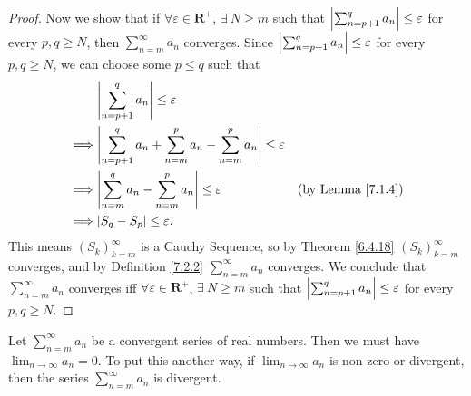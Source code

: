 \begin{proof}
    Now we show that if \(\forall \varepsilon \in \mathbf{R}^+\), \(\exists\ N \geq m\) such that \(\abs*{\sum_{n = p + 1}^q a_n} \leq \varepsilon\) for every \(p, q \geq N\), then \(\sum_{n = m}^\infty a_n\) converges.
    Since \(\abs*{\sum_{n = p + 1}^q a_n} \leq \varepsilon\) for every \(p, q \geq N\), we can choose some \(p \leq q\) such that
    \begin{align*}
                 & \abs*{\sum_{n = p + 1}^q a_n} \leq \varepsilon                                                                           \\
        \implies & \abs*{\sum_{n = p + 1}^q a_n + \sum_{n = m}^p a_n - \sum_{n = m}^p a_n} \leq \varepsilon                                 \\
        \implies & \abs*{\sum_{n = m}^q a_n - \sum_{n = m}^p a_n} \leq \varepsilon                          & \text{(by Lemma \ref{7.1.4})} \\
        \implies & \abs*{S_q - S_p} \leq \varepsilon.
    \end{align*}
    This means \((S_k)_{k = m}^\infty\) is a Cauchy Sequence, so by Theorem \ref{6.4.18} \((S_k)_{k = m}^\infty\) converges, and by Definition \ref{7.2.2} \(\sum_{n = m}^\infty a_n\) converges.
    We conclude that \(\sum_{n = m}^\infty a_n\) converges iff \(\forall \varepsilon \in \mathbf{R}^+\), \(\exists\ N \geq m\) such that \(\abs*{\sum_{n = p + 1}^q a_n} \leq \varepsilon\) for every \(p, q \geq N\).
\end{proof}

\begin{corollary}\label{7.2.6}
    Let \(\sum_{n = m}^\infty a_n\) be a convergent series of real numbers.
    Then we must have \(\lim_{n \to \infty} a_n = 0\).
    To put this another way, if \(\lim_{n \to \infty} a_n\) is non-zero or divergent, then the series \(\sum_{n = m}^\infty a_n\) is divergent.
\end{corollary}

